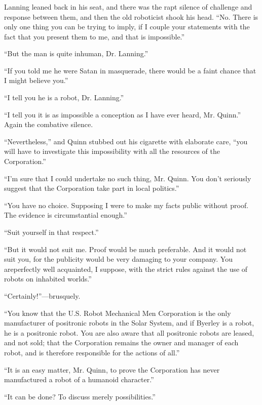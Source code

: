 \documentclass[10pt,a5paper,twoside]{book}
\begin{document}
\subsubsection*{}
Lanning leaned back in his seat, and there was the rapt silence of challenge and response between them, and then the old roboticist shook his head. “No. There is only one thing you can be trying to imply, if I couple your statements with the fact that you present them to me, and that is impossible.”

“But the man is quite inhuman, Dr. Lanning.”

“If you told me he were Satan in masquerade, there would be a faint chance that I might believe you.”

“I tell you he is a robot, Dr. Lanning.”

“I tell you it is as impossible a conception as I have ever heard, Mr. Quinn.” Again the combative silence.

“Nevertheless,” and Quinn stubbed out his cigarette with elaborate care, “you will have to investigate this impossibility with all the resources of the Corporation.”

“I’m sure that I could undertake no such thing, Mr. Quinn. You don’t seriously suggest that the Corporation take part in local politics.”

“You have no choice. Supposing I were to make my facts public without proof. The evidence is circumstantial enough.”

“Suit yourself in that respect.”

“But it would not suit me. Proof would be much preferable. And it would not suit you, for the publicity would be very damaging to your company. You areperfectly well acquainted, I suppose, with the strict rules against the use of robots on inhabited worlds.”

“Certainly!”—brusquely.

“You know that the U.S. Robot  Mechanical Men Corporation is the only manufacturer of positronic robots in the Solar System, and if Byerley is a robot, he is a positronic robot. You are also aware that all positronic robots are leased, and not sold; that the Corporation remains the owner and manager of each robot, and is therefore responsible for the actions of all.”

“It is an easy matter, Mr. Quinn, to prove the Corporation has never manufactured a robot of a humanoid character.”

“It can be done? To discuss merely possibilities.”
\end{document}
